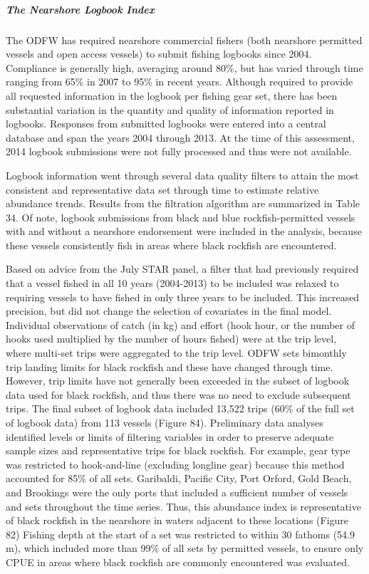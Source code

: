 \documentclass[11pt,
  english,
  letterpaper,
]{article}
\begin{document}
\hypertarget{the-nearshore-logbook-index}{%
\subparagraph{The Nearshore Logbook Index}\label{the-nearshore-logbook-index}}

The ODFW has required nearshore commercial fishers (both nearshore permitted vessels and open access vessels) to submit fishing logbooks since 2004. Compliance is generally high, averaging around 80\%, but has varied through time ranging from 65\% in 2007 to 95\% in recent years. Although required to provide all requested information in the logbook per fishing gear set, there has been substantial variation in the quantity and quality of information reported in logbooks. Responses from submitted logbooks were entered into a central database and span the years 2004 through 2013. At the time of this assessment, 2014 logbook submissions were not fully processed and thus were not available.

Logbook information went through several data quality filters to attain the most consistent and representative data set through time to estimate relative abundance trends. Results from the filtration algorithm are summarized in Table 34. Of note, logbook submissions from black and blue rockfish-permitted vessels with and without a nearshore endorsement were included in the analysis, because these vessels consistently fish in areas where black rockfish are encountered.

Based on advice from the July STAR panel, a filter that had previously required that a vessel fished in all 10 years (2004-2013) to be included was relaxed to requiring vessels to have fished in only three years to be included. This increased precision, but did not change the selection of covariates in the final model. Individual observations of catch (in kg) and effort (hook hour, or the number of hooks used multiplied by the number of hours fished) were at the trip level, where multi-set trips were aggregated to the trip level. ODFW sets bimonthly trip landing limits for black rockfish and these have changed through time. However, trip limits have not generally been exceeded in the subset of logbook data used for black rockfish, and thus there was no need to exclude subsequent trips. The final subset of logbook data included 13,522 trips (60\% of the full set of logbook data) from 113 vessels (Figure 84). Preliminary data analyses identified levels or limits of filtering variables in order to preserve adequate sample sizes and representative trips for black rockfish. For example, gear type was restricted to hook-and-line (excluding longline gear) because this method accounted for 85\% of all sets. Garibaldi, Pacific City, Port Orford, Gold Beach, and Brookings were the only ports that included a sufficient number of vessels and sets throughout the time series. Thus, this abundance index is representative of black rockfish in the nearshore in waters adjacent to these locations (Figure 82) Fishing depth at the start of a set was restricted to within 30 fathoms (54.9 m), which included more than 99\% of all sets by permitted vessels, to ensure only CPUE in areas where black rockfish are commonly encountered was evaluated.
\end{document}
